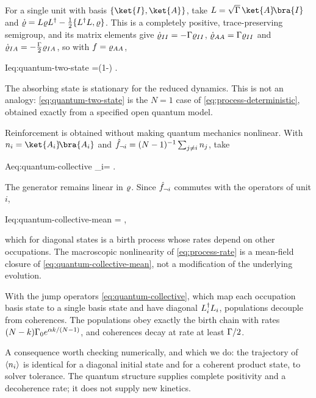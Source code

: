For a single unit with basis $\{\ket{I},\ket{A}\}$, take
$\jump=\sqrt{\Gam}\,\ket{A}\!\bra{I}$ and
$\dot{\varrho}=L\varrho L^{\dagger}-\tfrac12\{L^{\dagger}L,\varrho\}$.
This is a completely positive, trace-preserving semigroup, and its matrix
elements give $\dot{\varrho}_{II}=-\Gamma\varrho_{II}$,
$\dot{\varrho}_{AA}=\Gamma\varrho_{II}$ and
$\dot{\varrho}_{IA}=-\tfrac{\Gamma}{2}\varrho_{IA}$, so with $f=\varrho_{AA}$,
%
\begin{keyresult}{I}{eq:quantum-two-state}
  \dot \fconv=\Gam(1-\fconv) .
\end{keyresult}
%
The absorbing state is stationary for the reduced dynamics. This is not an
analogy: \cref{eq:quantum-two-state} is the $N=1$ case of
\cref{eq:process-deterministic}, obtained exactly from a specified open
quantum model.

Reinforcement is obtained without making quantum mechanics nonlinear. With
$n_i=\ket{A_i}\!\bra{A_i}$ and
$\hat {f}_{\neg i}=(N-1)^{-1}\sum_{j\neq i}n_j$, take
%
\begin{keyresult}{A}{eq:quantum-collective}
  \jump_i=\!\otimes{} .
\end{keyresult}
%
The generator remains linear in $\varrho$. Since $\hat {f}_{\neg i}$ commutes
with the operators of unit $i$,
%
\begin{keyresult}{I}{eq:quantum-collective-mean}
  = ,
\end{keyresult}
%
which for diagonal states is a birth process whose rates depend on other
occupations. The macroscopic nonlinearity of \cref{eq:process-rate} is a
mean-field closure of \cref{eq:quantum-collective-mean}, not a modification of
the underlying evolution.

\begin{proposition}\label{prop:classical-reduction}
  With the jump operators \cref{eq:quantum-collective}, which map each
  occupation basis state to a single basis state and have diagonal
  $L_i^{\dagger}L_i$, populations decouple from coherences. The
  populations obey exactly the birth chain with rates
  $(N-k)\Gamma_{0} e^{\alpha k/(N-1)}$, and coherences decay at rate at least
  $\Gamma/2$.
\end{proposition}

A consequence worth checking numerically, and which we do: the trajectory of
$\left\langle n_i \right\rangle$ is identical for a diagonal initial state and for a coherent
product state, to solver tolerance. The quantum structure supplies complete
positivity and a decoherence rate; it does not supply new kinetics.

